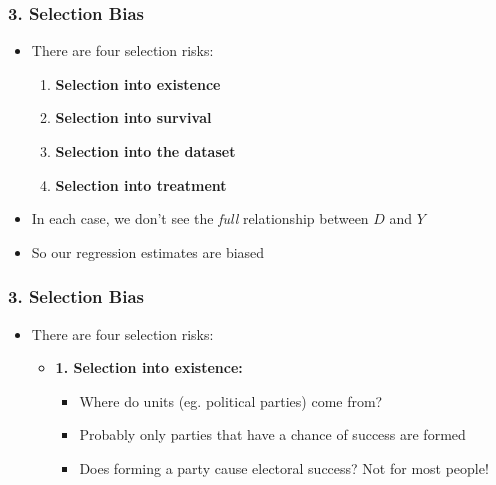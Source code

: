 \documentclass[xcolor=x11names,compress]{beamer}\usepackage[]{graphicx}\usepackage[]{color}
\renewcommand{\(}{\begin{columns}}
\renewcommand{\)}{\end{columns}}
\newcommand{\<}[1]{\begin{column}{#1}}
\renewcommand{\>}{\end{column}}
\begin{document}
\begin{frame}
\frametitle{3. Selection Bias}
\begin{itemize}
\item There are four selection risks:
\begin{enumerate}
\item \textbf{Selection into existence}
\item \textbf{Selection into survival}
\item \textbf{Selection into the dataset}
\item \textbf{Selection into treatment}
\end{enumerate}
\pause
\item In each case, we don't see the \textit{full} relationship between $D$ and $Y$
\pause
\item So our regression estimates are biased
\end{itemize}
\end{frame}

\begin{frame}
\frametitle{3. Selection Bias}
\begin{itemize}
\item There are four selection risks:
\begin{itemize}
\item \textbf{1. Selection into existence:}
\pause
\begin{itemize}
\item Where do units (eg. political parties) come from?
\pause
\item Probably only parties that have a chance of success are formed
\pause
\item Does forming a party cause electoral success? Not for most people!
\end{itemize}
\end{itemize}
\end{itemize}
\end{frame}
\end{document}
